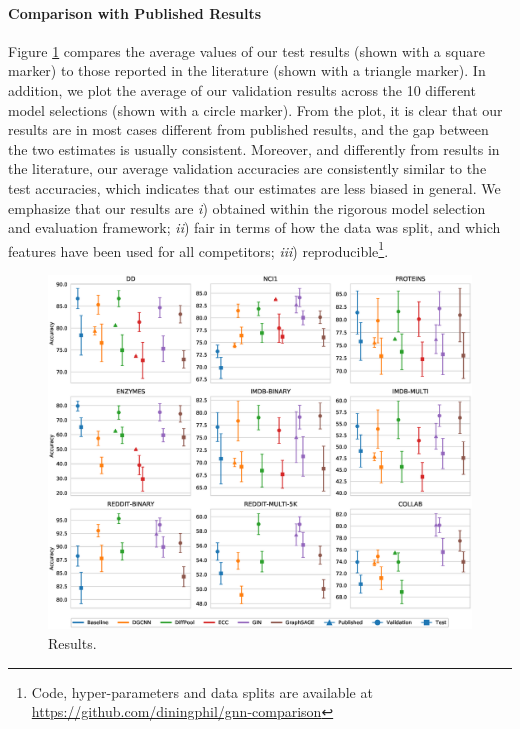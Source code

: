 

\paragraph{Comparison with Published Results}
Figure \ref{fig:comparison-plot} compares the average values of our test results (shown with a square marker) to those reported in the literature (shown with a triangle marker). In addition, we plot the average of our validation results across the 10 different model selections (shown with a circle marker). From the plot, it is clear that our results are in most cases different from published results, and the gap between the two estimates is usually consistent. Moreover, and differently from results in the literature, our average validation accuracies are consistently similar to the test accuracies, which indicates that our estimates are less biased in general. We emphasize that our results are \emph{i}) obtained within the rigorous model selection and evaluation framework; \emph{ii}) fair in terms of how the data was split, and which features have been used for all competitors; \emph{iii}) reproducible\footnote{Code, hyper-parameters and data splits are available at \url{https://github.com/diningphil/gnn-comparison}}.

\begin{figure}[h!]
    \centering
    \includegraphics[width=\linewidth]{Figures/Chapter4/07-comparison-results.eps}
    \caption{Results.}
    \label{fig:comparison-plot}
\end{figure}

